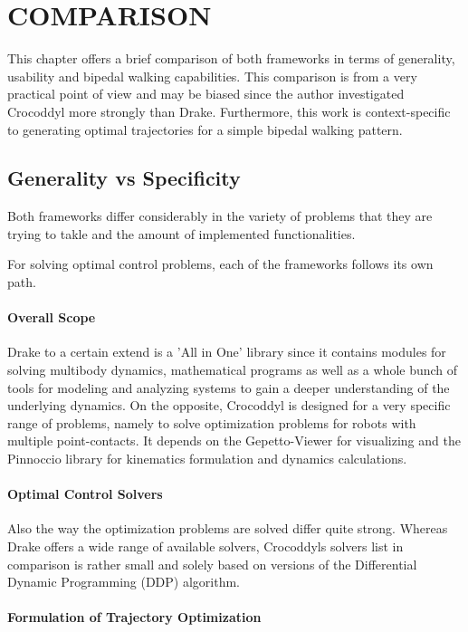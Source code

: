 \chapter{COMPARISON}
This chapter offers a brief comparison of both frameworks in terms of generality, usability and bipedal walking capabilities. This comparison is from a very practical point of view and may be biased since the author investigated Crocoddyl more strongly than Drake.  Furthermore, this work is context-specific to generating optimal trajectories for a simple bipedal walking pattern.

 
\section{Generality vs Specificity}
Both frameworks differ considerably in the variety of problems that they are trying to takle and the amount of implemented functionalities. 

For solving optimal control problems, each of the frameworks follows its own path.

\subsubsection{Overall Scope}

Drake to a certain extend is a 'All in One' library since it contains modules for solving multibody dynamics, mathematical programs as well as a whole bunch of tools for modeling and analyzing systems to gain a deeper understanding of the underlying dynamics.
On the opposite, Crocoddyl is designed for a very specific range of problems, namely to solve optimization problems for robots with multiple point-contacts. It depends on the Gepetto-Viewer for visualizing and the Pinnoccio library for kinematics formulation and dynamics calculations.

\subsubsection{Optimal Control Solvers}

Also the way the optimization problems are solved differ quite strong. Whereas Drake offers a wide range of available solvers, Crocoddyls solvers list in comparison is rather small and solely based on versions of the Differential Dynamic Programming (DDP) algorithm. 

\subsubsection{Formulation of Trajectory Optimization}

